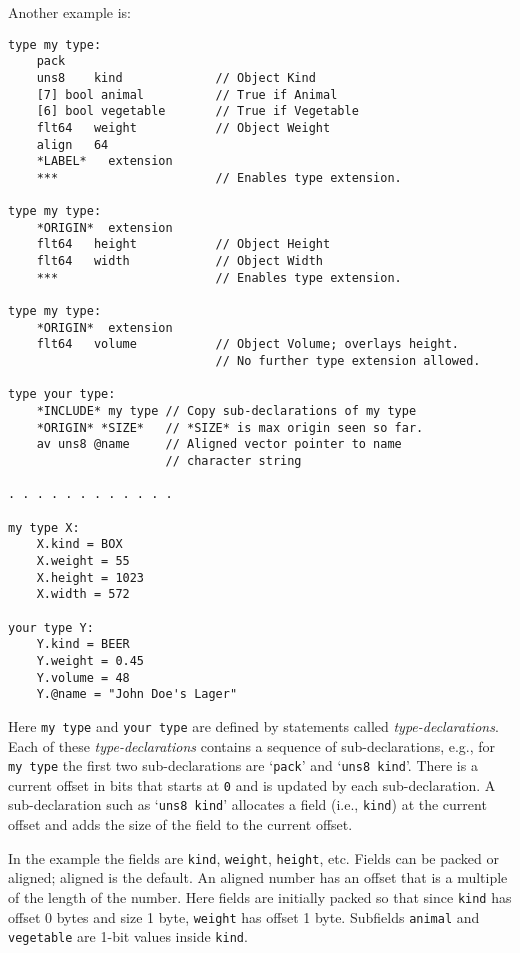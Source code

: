\documentclass[12pt]{article}
\newenvironment{indpar}[1][0.3in]%
	{\begin{list}{}%
		     {\setlength{\itemsep}{0in}%
		      \setlength{\topsep}{0in}%
		      \setlength{\parsep}{1ex}%
		      \setlength{\labelwidth}{#1}%
		      \setlength{\leftmargin}{#1}%
		      \addtolength{\leftmargin}{\labelsep}}%
	 \item}%
	{\end{list}}
\begin{document}
Another example is:

\begin{indpar}\begin{verbatim}
type my type:
    pack
    uns8    kind             // Object Kind
    [7] bool animal          // True if Animal
    [6] bool vegetable       // True if Vegetable
    flt64   weight           // Object Weight
    align   64
    *LABEL*   extension
    ***                      // Enables type extension.

type my type:
    *ORIGIN*  extension
    flt64   height           // Object Height
    flt64   width            // Object Width
    ***                      // Enables type extension.

type my type:
    *ORIGIN*  extension
    flt64   volume           // Object Volume; overlays height.
                             // No further type extension allowed.

type your type:
    *INCLUDE* my type // Copy sub-declarations of my type
    *ORIGIN* *SIZE*   // *SIZE* is max origin seen so far.
    av uns8 @name     // Aligned vector pointer to name
                      // character string

. . . . . . . . . . . .

my type X:
    X.kind = BOX
    X.weight = 55
    X.height = 1023
    X.width = 572

your type Y:
    Y.kind = BEER
    Y.weight = 0.45
    Y.volume = 48
    Y.@name = "John Doe's Lager"
\end{verbatim}\end{indpar}

Here {\tt my type} and {\tt your type} are defined by
statements called {\em type-declarations}.  Each of these
{\em type-declarations} contains a sequence of sub-declarations, e.g.,
for {\tt my type} the first two sub-declarations are
`{\tt pack}' and `{\tt uns8 kind}'.  There is a current
offset in bits that starts at {\tt 0} and is updated by each sub-declaration.
A sub-declaration such as `{\tt uns8 kind}' allocates a field
(i.e., {\tt kind})
at the current offset and adds the size of the field to the
current offset.

In the example the fields are {\tt kind}, {\tt weight}, {\tt height}, etc.
Fields can be packed or aligned; aligned is the default.  An aligned number has an offset
that is a multiple of the length of the number.
Here fields are initially packed
so that since {\tt kind} has offset 0 bytes and size 1 byte,
{\tt weight} has offset 1 byte.  Subfields {\tt animal}
and {\tt vegetable} are 1-bit values inside {\tt kind}.
\end{document}
